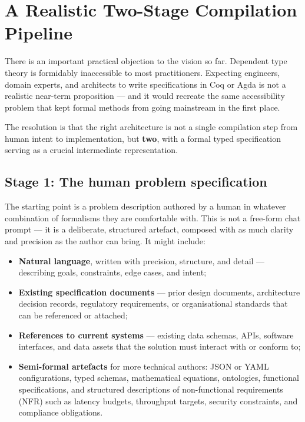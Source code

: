 \documentclass[12pt]{article}
\begin{document}
\section{A Realistic Two-Stage Compilation Pipeline}

There is an important practical objection to the vision so far. Dependent
type theory is formidably inaccessible to most practitioners. Expecting
engineers, domain experts, and architects to write specifications in Coq or
Agda is not a realistic near-term proposition --- and it would recreate the
same accessibility problem that kept formal methods from going mainstream in
the first place.

The resolution is that the right architecture is not a single compilation
step from human intent to implementation, but \textbf{two}, with a formal
typed specification serving as a crucial intermediate representation.

\subsection{Stage 1: The human problem specification}

The starting point is a problem description authored by a human in whatever
combination of formalisms they are comfortable with. This is not a free-form
chat prompt --- it is a deliberate, structured artefact, composed with as
much clarity and precision as the author can bring. It might include:

\begin{itemize}
  \item \textbf{Natural language}, written with precision, structure, and
        detail --- describing goals, constraints, edge cases, and intent;
  \item \textbf{Existing specification documents} --- prior design documents,
        architecture decision records, regulatory requirements, or
        organisational standards that can be referenced or attached;
  \item \textbf{References to current systems} --- existing data schemas,
        APIs, software interfaces, and data assets that the solution must
        interact with or conform to;
  \item \textbf{Semi-formal artefacts} for more technical authors: JSON or
        YAML configurations, typed schemas, mathematical equations,
        ontologies, functional specifications, and structured descriptions
        of non-functional requirements (NFR) such as latency budgets, throughput
        targets, security constraints, and compliance obligations.
\end{itemize}
\end{document}
